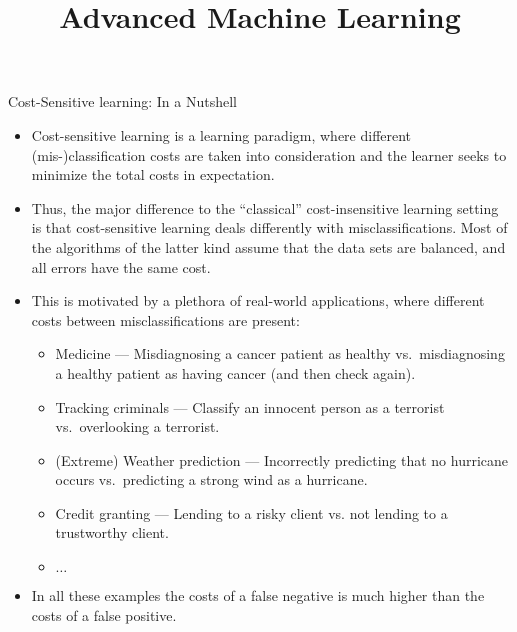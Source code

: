 \documentclass[11pt,compress,t,notes=noshow, xcolor=table]{beamer}
\title{Advanced Machine Learning}
\date{}
\begin{document}



\sloppy


\begin{vbframe}{Cost-Sensitive learning: In a Nutshell}
	\scriptsize{
		\begin{itemize}
%			
		\item Cost-sensitive learning is a learning paradigm, where different (mis-)classification costs are taken into consideration and the learner seeks to minimize the total costs in expectation.
%
		\item Thus, the major difference to the ``classical'' cost-insensitive learning setting is that cost-sensitive learning deals differently with misclassifications. Most of the algorithms of the latter kind assume that the data sets are balanced, and all errors have the same cost.
		
%
		\item This is motivated by a plethora of real-world applications, where different costs between misclassifications are present:
%		
		\begin{itemize}
			\scriptsize
%			
			\item Medicine --- Misdiagnosing a cancer patient as healthy vs.\ misdiagnosing a healthy patient as having cancer (and then check again).
			\item Tracking criminals ---  Classify an innocent person as a terrorist vs.\ overlooking a terrorist.
			\item (Extreme) Weather prediction ---  Incorrectly predicting that no hurricane occurs vs.\ predicting a strong wind as a hurricane.
%			
			\item Credit granting --- Lending to a risky client vs. not lending to a trustworthy client.
			\item $\ldots$
%    	
%			
		\end{itemize}
%	
		\item In all these examples the costs of a false negative is much higher than the costs of a false positive.
%
		\end{itemize}
		
	}
\end{vbframe}
\end{document}
